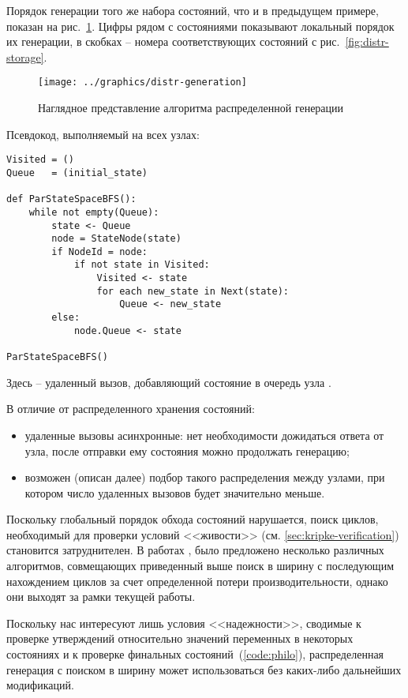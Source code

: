 Порядок генерации того же набора состояний, что и в предыдущем примере, показан на
рис.~\ref{fig:distr-generation}. Цифры рядом с состояниями показывают локальный порядок их
генерации, в скобках -- номера соответствующих состояний с рис.~\ref{fig:distr-storage}.

\begin{figure}[!htb]
  \centering
  \texttt{[image: ../graphics/distr-generation]}
  \caption{Наглядное представление алгоритма распределенной генерации}
  \label{fig:distr-generation}
\end{figure}

Псевдокод, выполняемый на всех узлах:

\begin{lstlisting}[style=pseudocode]
Visited = ()
Queue   = (initial_state)

def ParStateSpaceBFS():
    while not empty(Queue):
        state <- Queue
        node = StateNode(state)
        if NodeId = node:
            if not state in Visited:
                Visited <- state
                for each new_state in Next(state):
                    Queue <- new_state
        else:
            node.Queue <- state

ParStateSpaceBFS()
\end{lstlisting}

Здесь  -- удаленный вызов, добавляющий состояние в очередь узла
.

В отличие от распределенного хранения состояний:
\begin{itemize}
\item удаленные вызовы асинхронные: нет необходимости дожидаться ответа от узла, после
  отправки ему состояния можно продолжать генерацию;
\item возможен (описан далее) подбор такого распределения  между узлами,
  при котором число удаленных вызовов будет значительно меньше.~\cite{LS99}
\end{itemize}

Поскольку глобальный порядок обхода состояний нарушается, поиск циклов, необходимый для
проверки условий <<живости>> (см. \ref{sec:kripke-verification}) становится
затруднителен. В работах \cite{DLTL1}, \cite{DLTL2} было предложено несколько различных
алгоритмов, совмещающих приведенный выше поиск в ширину с последующим нахождением циклов
за счет определенной потери производительности, однако они выходят за рамки текущей работы.

Поскольку нас интересуют лишь условия <<надежности>>, сводимые к проверке утверждений
относительно значений переменных в некоторых состояниях и к проверке финальных
состояний~(\ref{code:philo}), распределенная генерация с поиском в ширину может
использоваться без каких-либо дальнейших модификаций.

